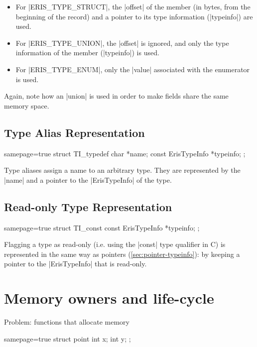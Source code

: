 \begin{itemize}
  \item For \Mc|ERIS_TYPE_STRUCT|, the \Mc|offset| of the member (in bytes,
    from the beginning of the record) and a pointer to its type information
    (\Mc|typeinfo|) are used.
  \item For \Mc|ERIS_TYPE_UNION|, the \Mc|offset| is ignored, and only the
    type information of the member (\Mc|typeinfo|) is used.
  \item For \Mc|ERIS_TYPE_ENUM|, only the \Mc|value| associated with the
    enumerator is used.
\end{itemize}

\noindent
Again, note how an \Mc|union| is used in order to make fields share the same
memory space.


\subsection{Type Alias Representation}

\begin{ccode*}{samepage=true}
  struct TI_typedef {
    char               *name;
    const ErisTypeInfo *typeinfo;
  };
\end{ccode*}

Type aliases assign a name to an arbitrary type. They are represented by the
\Mc|name| and a pointer to the \Mc|ErisTypeInfo| of the type.


\subsection{Read-only Type Representation}

\begin{ccode*}{samepage=true}
  struct TI_const {
    const ErisTypeInfo *typeinfo;
  };
\end{ccode*}

\noindent
Flagging a type as read-only (i.e. using the \Mc|const| type qualifier in C)
is represented in the same way as pointers (\autoref{sec:pointer-typeinfo}):
by keeping a pointer to the \Mc|ErisTypeInfo| that is read-only.


\section{Memory owners and life-cycle}

Problem: functions that allocate memory

\begin{ccode*}{samepage=true}
struct point {
	int x;
	int y;
};
\end{ccode*}

